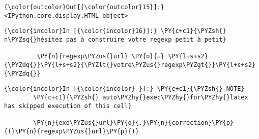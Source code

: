 \begin{Verbatim}[commandchars=\\\{\},frame=single,framerule=0.3mm,rulecolor=\color{cellframecolor}]
{\color{outcolor}Out[{\color{outcolor}15}]:} <IPython.core.display.HTML object>
\end{Verbatim}
            
    \begin{Verbatim}[commandchars=\\\{\},frame=single,framerule=0.3mm,rulecolor=\color{cellframecolor}]
{\color{incolor}In [{\color{incolor}16}]:} \PY{c+c1}{\PYZsh{} n\PYZsq{}hésitez pas à construire votre regexp petit à petit}
         
         \PY{n}{regexp\PYZus{}url} \PY{o}{=} \PY{l+s+s2}{\PYZdq{}}\PY{l+s+s2}{\PYZlt{}votre\PYZus{}regexp\PYZgt{}}\PY{l+s+s2}{\PYZdq{}}
\end{Verbatim}


    \begin{Verbatim}[commandchars=\\\{\},frame=single,framerule=0.3mm,rulecolor=\color{cellframecolor}]
{\color{incolor}In [{\color{incolor} }]:} \PY{c+c1}{\PYZsh{} NOTE}
        \PY{c+c1}{\PYZsh{} auto\PYZhy{}exec\PYZhy{}for\PYZhy{}latex has skipped execution of this cell}
        
        \PY{n}{exo\PYZus{}url}\PY{o}{.}\PY{n}{correction}\PY{p}{(}\PY{n}{regexp\PYZus{}url}\PY{p}{)}
\end{Verbatim}



    
    
    
